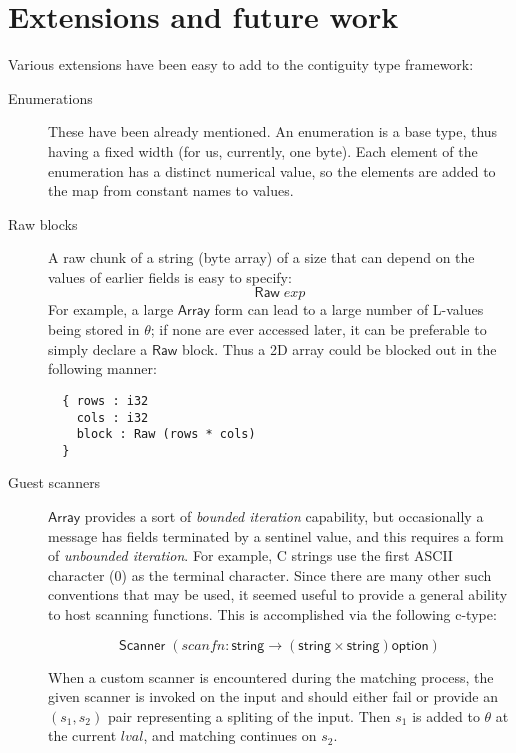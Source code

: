 \documentclass[svgnames]{llncs}
\newcommand{\konst}[1]{\ensuremath{\mathsf{#1}}}
\newcommand{\lval}{\ensuremath{\mathit{lval}}}
\begin{document}
\section{Extensions and future work}

Various extensions have been easy to add to the contiguity type
framework:

\begin{description}

\item [Enumerations] These have been already mentioned. An enumeration
  is a base type, thus having a fixed width (for us, currently, one
  byte). Each element of the enumeration has a distinct numerical
  value, so the elements are added to the map from constant names to values.

\item [Raw blocks] A raw chunk of a string (byte array) of a size that
  can depend on the values of earlier fields is easy to specify:
  \[ \konst{Raw}\; \mathit{exp} \]
For example, a large \konst{Array} form can lead to a large number of
L-values being stored in $\theta$; if none are ever accessed later, it
can be preferable to simply declare a \konst{Raw} block. Thus a 2D
array could be blocked out in the following manner:

\begin{verbatim}
  { rows : i32
    cols : i32
    block : Raw (rows * cols)
  }
\end{verbatim}

\item [Guest scanners] \konst{Array} provides a sort of \emph{bounded
  iteration} capability, but occasionally a message has fields
  terminated by a sentinel value, and this requires a form of
  \emph{unbounded iteration}. For example, C strings use the first
  ASCII character (0) as the terminal character. Since there are many
  other such conventions that may be used, it seemed useful to provide
  a general ability to host scanning functions. This is accomplished via the following c-type:

  \[ \konst{Scanner}\;
     (\mathit{scanfn} : \konst{string} \to (\konst{string} \times \konst{string})\konst{option}) \]

  When a custom scanner is encountered during the matching process,
  the given scanner is invoked on the input and should either fail or
  provide an $(s_1,s_2)$ pair representing a spliting of the
  input. Then $s_1$ is added to $\theta$ at the current \lval, and
  matching continues on $s_2$.


\end{description}
\end{document}

